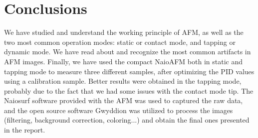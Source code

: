 \documentclass[11pt,a4paper]{article}
\begin{document}
\newpage
\section{Conclusions}
We have studied and understand the working principle of AFM, as well as the two most common operation modes: static or contact mode, and tapping or dynamic mode. We have read about and recognize the most common artifacts in AFM images. Finally, we have used the compact NaioAFM both in static and tapping mode to measure three different samples, after optimizing the PID values using a calibration sample. Better results were obtained in the tapping mode, probably due to the fact that we had some issues with the contact mode tip. The Naiosurf software provided with the AFM was used to captured the raw data, and the open source software Gwyddion was utilized to process the images (filtering, background correction, coloring...) and obtain the final ones presented in the report.

\nocite{*}
\vfill


\end{document}
